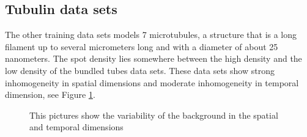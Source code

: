 \subsection{Tubulin data sets}
The other training data sets models 7 microtubules, a structure that is a long filament up to several micrometers long and with a diameter of about 25 nanometers. The spot density lies somewhere between the high density and the low density of the bundled tubes data sets. These data sets show strong inhomogeneity in spatial dimensions and moderate inhomogeneity in temporal dimension, see Figure \ref{tubulinVariableBg}.

\begin{figure}
\hfill
{}
	\caption{This pictures show the variability of the background in the spatial and temporal dimensions}
	\label{tubulinVariableBg}	
\end{figure}

